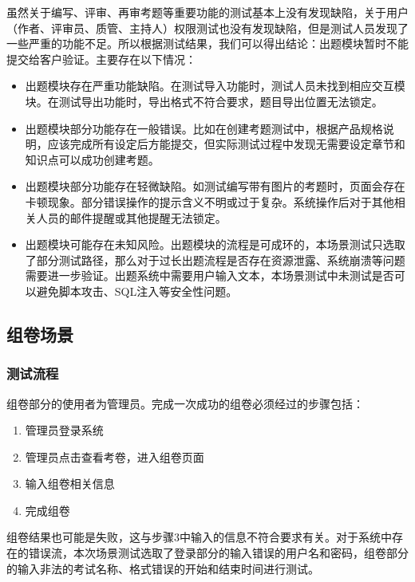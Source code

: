 \documentclass[hyperref, a4paper]{ctexart}
\begin{document}
虽然关于编写、评审、再审考题等重要功能的测试基本上没有发现缺陷，关于用户（作者、评审员、质管、主持人）权限测试也没有发现缺陷，但是测试人员发现了一些严重的功能不足。所以根据测试结果，我们可以得出结论：出题模块暂时不能提交给客户验证。主要存在以下情况：

\begin{itemize}
\item
  出题模块存在严重功能缺陷。在测试导入功能时，测试人员未找到相应交互模块。在测试导出功能时，导出格式不符合要求，题目导出位置无法锁定。
\item
  出题模块部分功能存在一般错误。比如在创建考题测试中，根据产品规格说明，应该完成所有设定后方能提交，但实际测试过程中发现无需要设定章节和知识点可以成功创建考题。
\item
  出题模块部分功能存在轻微缺陷。如测试编写带有图片的考题时，页面会存在卡顿现象。部分错误操作的提示含义不明或过于复杂。系统操作后对于其他相关人员的邮件提醒或其他提醒无法锁定。
\item
  出题模块可能存在未知风险。出题模块的流程是可成环的，本场景测试只选取了部分测试路径，那么对于过长出题流程是否存在资源泄露、系统崩溃等问题需要进一步验证。出题系统中需要用户输入文本，本场景测试中未测试是否可以避免脚本攻击、SQL注入等安全性问题。
\end{itemize}

\hypertarget{ux7ec4ux5377ux573aux666f}{%
\subsection{组卷场景}\label{ux7ec4ux5377ux573aux666f}}

\hypertarget{ux6d4bux8bd5ux6d41ux7a0b-1}{%
\subsubsection{测试流程}\label{ux6d4bux8bd5ux6d41ux7a0b-1}}

组卷部分的使用者为管理员。完成一次成功的组卷必须经过的步骤包括：

\begin{enumerate}
\def\labelenumi{\arabic{enumi}.}
\item
  管理员登录系统
\item
  管理员点击查看考卷，进入组卷页面
\item
  输入组卷相关信息
\item
  完成组卷
\end{enumerate}

组卷结果也可能是失败，这与步骤3中输入的信息不符合要求有关。对于系统中存在的错误流，本次场景测试选取了登录部分的输入错误的用户名和密码，组卷部分的输入非法的考试名称、格式错误的开始和结束时间进行测试。
\end{document}
